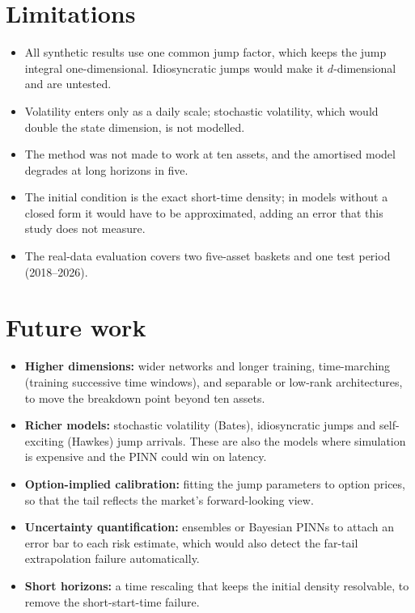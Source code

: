 \section{Limitations}
\begin{itemize}
  \item All synthetic results use one common jump factor, which keeps the jump integral one-dimensional.
    Idiosyncratic jumps would make it $d$-dimensional and are untested.
  \item Volatility enters only as a daily scale; stochastic volatility, which would double the state dimension, is
    not modelled.
  \item The method was not made to work at ten assets, and the amortised model degrades at long horizons in five.
  \item The initial condition is the exact short-time density; in models without a closed form it would have to be
    approximated, adding an error that this study does not measure.
  \item The real-data evaluation covers two five-asset baskets and one test period (2018--2026).
\end{itemize}

\section{Future work}
\begin{itemize}
  \item \textbf{Higher dimensions:} wider networks and longer training, time-marching (training successive time
    windows), and separable or low-rank architectures, to move the breakdown point beyond ten assets.
  \item \textbf{Richer models:} stochastic volatility (Bates), idiosyncratic jumps and self-exciting (Hawkes) jump
    arrivals. These are also the models where simulation is expensive and the PINN could win on latency.
  \item \textbf{Option-implied calibration:} fitting the jump parameters to option prices, so that the tail reflects
    the market's forward-looking view.
  \item \textbf{Uncertainty quantification:} ensembles or Bayesian PINNs to attach an error bar to each risk estimate,
    which would also detect the far-tail extrapolation failure automatically.
  \item \textbf{Short horizons:} a time rescaling that keeps the initial density resolvable, to remove the
    short-start-time failure.
\end{itemize}
